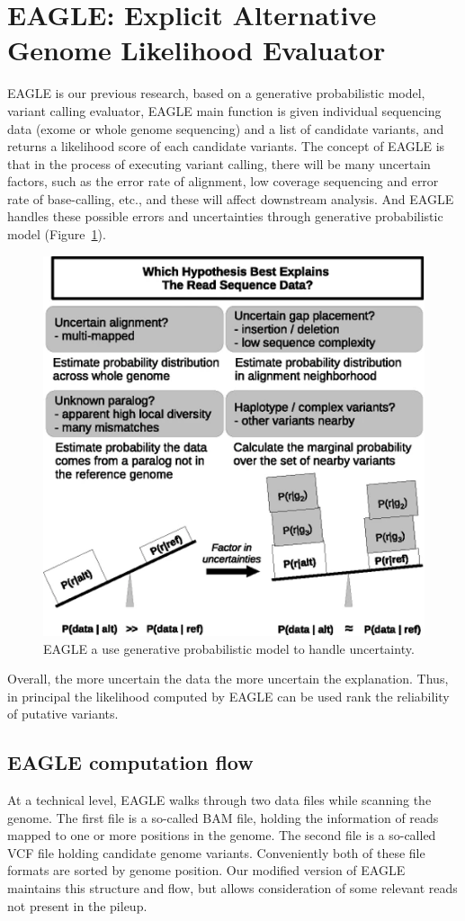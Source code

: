 \section{EAGLE: Explicit Alternative Genome Likelihood Evaluator}
EAGLE \cite{kuo2018eagle} is our previous research, based on a generative probabilistic model, variant calling evaluator, EAGLE main function is given individual sequencing data (exome or whole genome sequencing) and a list of candidate variants, and returns a likelihood score of each candidate variants.
The concept of EAGLE is that in the process of executing variant calling, there will be many uncertain factors, such as the error rate of alignment, low coverage sequencing and error rate of base-calling, etc., and these will affect downstream analysis. And EAGLE handles these possible errors and uncertainties through generative probabilistic model  (Figure~\ref{eagle_model}).
\begin{figure}[ht]
\center
\includegraphics[width=0.6\columnwidth]{body/image/eagle_model.png}
\caption[EAGLE model]{EAGLE a use generative probabilistic model to handle uncertainty.}
\label{eagle_model}
\end{figure}

Overall, the more uncertain the data the more uncertain the explanation.  Thus, in principal the likelihood computed by EAGLE can be used rank the reliability of putative variants.

\subsection{EAGLE computation flow}
At a technical level, EAGLE walks through two data files while scanning the genome.  The first file is a so-called BAM file, holding the information of reads mapped to one or more positions in the genome.  The second file is a so-called VCF file holding candidate genome variants.  Conveniently both of these file formats are sorted by genome position.  Our modified version of EAGLE maintains this structure and flow, but allows consideration of some relevant reads not present in the pileup.


